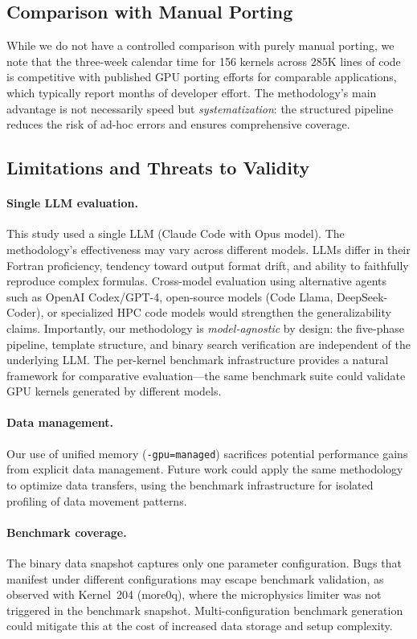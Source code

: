 \documentclass[conference]{IEEEtran}
\begin{document}
\subsection{Comparison with Manual Porting}

While we do not have a controlled comparison with purely manual porting, we
note that the three-week calendar time for 156 kernels across 285K lines of
code is competitive with published GPU porting efforts for comparable
applications, which typically report months of developer effort. The
methodology's main advantage is not necessarily speed but
\emph{systematization}: the structured pipeline reduces the risk of ad-hoc
errors and ensures comprehensive coverage.

\subsection{Limitations and Threats to Validity}

\paragraph{Single LLM evaluation.}
This study used a single LLM (Claude Code with Opus model). The
methodology's effectiveness may vary across different models. LLMs differ in
their Fortran proficiency, tendency toward output format drift, and ability
to faithfully reproduce complex formulas. Cross-model evaluation using
alternative agents such as OpenAI Codex/GPT-4, open-source models (Code
Llama, DeepSeek-Coder), or specialized HPC code models would strengthen the
generalizability claims. Importantly, our methodology is \emph{model-agnostic}
by design: the five-phase pipeline, template structure, and binary search
verification are independent of the underlying LLM. The per-kernel benchmark
infrastructure provides a natural framework for comparative evaluation---the
same benchmark suite could validate GPU kernels generated by different models.

\paragraph{Data management.}
Our use of unified memory (\texttt{-gpu=managed}) sacrifices potential
performance gains from explicit data management. Future work could apply the
same methodology to optimize data transfers, using the benchmark
infrastructure for isolated profiling of data movement patterns.

\paragraph{Benchmark coverage.}
The binary data snapshot captures only one parameter configuration. Bugs that
manifest under different configurations may escape benchmark validation, as
observed with Kernel~204 (more0q), where the microphysics limiter was not
triggered in the benchmark snapshot. Multi-configuration benchmark generation
could mitigate this at the cost of increased data storage and setup
complexity.
\end{document}
